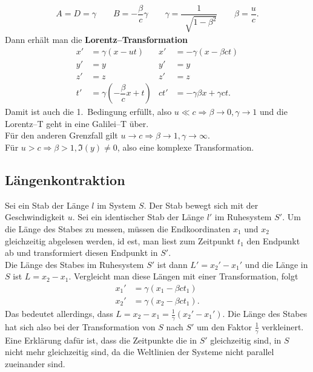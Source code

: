 \documentclass[a4paper,12pt]{article}
\begin{document}
\begin{align*} 
        A=D=\gamma \qquad B=-\dfrac{\beta }{c}\gamma \qquad \gamma =\dfrac{1}{\,\sqrt[]{1-\beta ^2}}\qquad \beta =\dfrac{u}{c}
.\end{align*} 
Dann erhält man die \textbf{Lorentz--Transformation} 
\begin{align*} 
        x'&=\gamma \left(x-ut\right)&x'&=-\gamma \left(x-\beta ct\right)\\
        y'&=y&y'&=y\\
        z'&=z&z'&=z\\
        t'&=\gamma \left(-\dfrac{\beta }{c}x+t\right)&ct'&=-\gamma \beta x+\gamma ct
.\end{align*} 
Damit ist auch die 1.\ Bedingung erfüllt, also $u\ll c\Rightarrow \beta \rightarrow 0,\gamma \rightarrow 1$ und die Lorentz--T geht in eine Galilei--T über.\\\indent
Für den anderen Grenzfall gilt $u\rightarrow c\Rightarrow \beta \rightarrow 1,\gamma \rightarrow \infty$.\\\indent
Für $u>c\Rightarrow \beta >1,\mathfrak{I}\left(y\right)\neq 0$, also eine komplexe Transformation.

\subsection{Längenkontraktion}
Sei ein Stab der Länge $l$ im System $S$. Der Stab bewegt sich mit der Geschwindigkeit $u$. Sei ein identischer Stab der Länge $l'$ im Ruhesystem $S'$. Um die Länge des Stabes zu messen, müssen die Endkoordinaten $x_1$ und $x_2$ \glqq gleichzeitig\grqq{} abgelesen werden, id est, man liest zum Zeitpunkt $t_1$ den Endpunkt ab und transformiert diesen Endpunkt in $S'$.\\\indent
Die Länge des Stabes im Ruhesystem $S'$ ist dann $L'=x_2'-x_1'$ und die Länge in $S$ ist $L=x_2-x_1$. Vergleicht man diese Längen mit einer Transformation, folgt
\begin{align*} 
        x_1'&=\gamma \left(x_1-\beta ct_1\right)\\
        x_2'&=\gamma \left(x_2-\beta ct_1\right)
.\end{align*} 
Das bedeutet allerdings, dass $L=x_2-x_1=\tfrac{1}{\gamma }\left(x_2'-x_1'\right)$. Die Länge des Stabes hat sich also bei der Transformation von $S$ nach $S'$ um den Faktor $\tfrac{1}{\gamma }$ verkleinert. Eine Erklärung dafür ist, dass die Zeitpunkte die in $S'$ gleichzeitig sind, in $S$ nicht mehr gleichzeitig sind, da die Weltlinien der Systeme nicht parallel zueinander sind.
\end{document}
